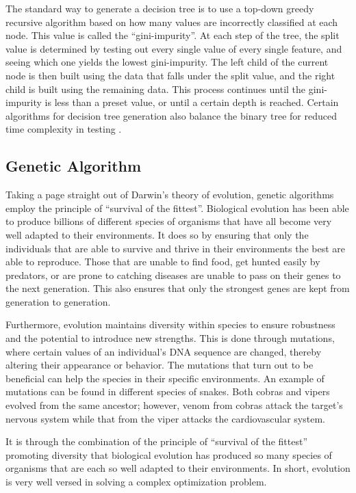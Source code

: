 \documentclass[12pt]{article}
\begin{document}
The standard way to generate a decision tree is to use a top-down greedy recursive algorithm based on how many values are incorrectly classified at each node. This value is called the ``gini-impurity''. At each step of the tree, the split value is determined by testing out every single value of every single feature, and seeing which one yields the lowest gini-impurity. The left child of the current node is then built using the data that falls under the split value, and the right child is built using the remaining data. This process continues until the gini-impurity is less than a preset value, or until a certain depth is reached. Certain algorithms for decision tree generation also balance the binary tree for reduced time complexity in testing \autocite{scikit-learn}.

\subsection{Genetic Algorithm}

Taking a page straight out of Darwin's theory of evolution, genetic algorithms employ the principle of ``survival of the fittest''. Biological evolution has been able to produce billions \autocite{Sweetlove_2011} of different species of organisms that have all become very well adapted to their environments. It does so by ensuring that only the individuals that are able to survive and thrive in their environments the best are able to reproduce. Those that are unable to find food, get hunted easily by predators, or are prone to catching diseases are unable to pass on their genes to the next generation. This also ensures that only the strongest genes are kept from generation to generation.

Furthermore, evolution maintains diversity within species to ensure robustness and the potential to introduce new strengths. This is done through mutations, where certain values of an individual's DNA sequence are changed, thereby altering their appearance or behavior. The mutations that turn out to be beneficial can help the species in their specific environments. An example of mutations can be found in different species of snakes. Both cobras and vipers evolved from the same ancestor; however, venom from cobras attack the target's nervous system while that from the viper attacks the cardiovascular system.

It is through the combination of the principle of ``survival of the fittest'' promoting diversity that biological evolution has produced so many species of organisms that are each so well adapted to their environments. In short, evolution is very well versed in solving a complex optimization problem.
\end{document}
